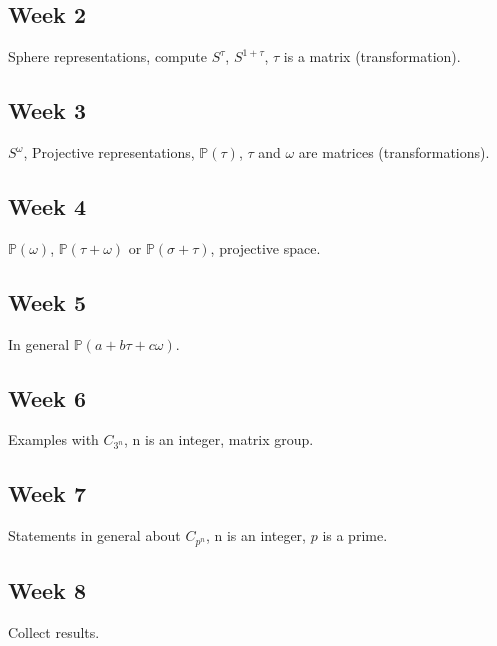 \documentclass[12pt]{article}
\begin{document}
\subsection{Week 2}
Sphere representations, compute $S^{\tau}$, $S^{1+\tau}$, $\tau$ is a matrix (transformation).

\subsection{Week 3}
$S^{\omega}$, Projective representations, $\mathbb{P}(\tau)$, $\tau$ and $\omega$ are matrices (transformations).

\subsection{Week 4}
$\mathbb{P}(\omega)$, $\mathbb{P}(\tau + \omega)$ or $\mathbb{P}(\sigma + \tau)$, projective space.

\subsection{Week 5}
In general $\mathbb{P}(a + b\tau + c\omega)$.

\subsection{Week 6}
Examples with $C_{3^n}$, n is an integer, matrix group.

\subsection{Week 7}
Statements in general about $C_{p^n}$, n is an integer, $p$ is a prime.

\subsection{Week 8}
Collect results.



\end{document}
